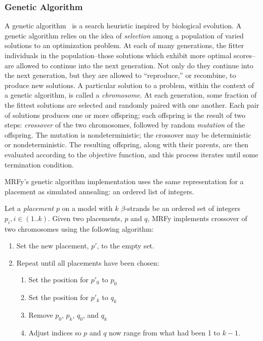 \documentclass{acm_proc_article-sp}
\begin{document}
\subsubsection{Genetic Algorithm}

A genetic algorithm~\cite{Holland:1977hl} is a search heuristic inspired by 
biological evolution.
A genetic algorithm relies on the idea of \emph{selection} among a population of
varied solutions to an optimization problem.
At each of many generations, the fitter individuals in the population--those
solutions which exhibit more optimal scores--are allowed to continue into the
next generation.
Not only do they continue into the next generation, but they are allowed to
``reproduce,'' or recombine, to produce new solutions.
A particular solution to a problem, within the context of a genetic algorithm,
is called a \emph{chromosome}.
At each generation, some fraction of the fittest solutions are selected and
randomly paired with one another.
Each pair of solutions produces one or more offspring; each offspring is the
result of two steps: \emph{crossover} of the two chromosomes, followed by
random \emph{mutation} of the offspring.
The mutation is nondeterministic; the crossover may be deterministic or
nondeterministic.
The resulting offspring, along with their parents, are then evaluated according
to the objective function, and this process iterates until some termination
condition.


MRFy's genetic algorithm implementation uses the same representation for a
placement as simulated annealing: an ordered list of integers.

Let a \emph{placement} $p$ on a model with $k$ $\beta$-strands be an ordered 
set of integers $p_{i}, i \in (1..k)$.
Given two placements, $p$ and $q$, MRFy implements crossover of two chromosomes 
using the following algorithm:

\begin{enumerate}
  \item Set the new placement, $p'$, to the empty set.
  \item Repeat until all placements have been chosen:
  \begin{enumerate}
    \item Set the position for $p'_{0}$ to $p_{0}$
    \item Set the position for $p'_{k}$ to $q_{k}$
    \item Remove $p_{0}$, $p_{k}$, $q_{0}$, and $q_{k}$
    \item Adjust indices so $p$ and $q$ now range from what had been 1 to $k-1$.
  \end{enumerate}
\end{enumerate}
\end{document}
